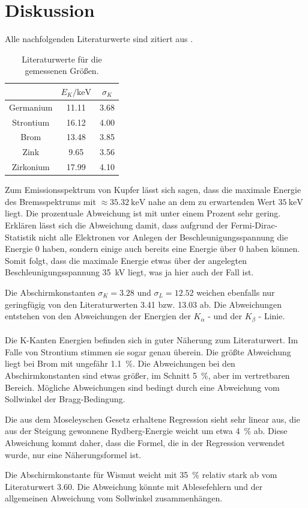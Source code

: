 \section{Diskussion}
Alle nachfolgenden Literaturwerte sind zitiert aus \cite{literatur}.
\begin{table}
  \centering
  \caption{Literaturwerte für die gemessenen Größen.}
  \label{tab:8}
  \begin{tabular}{c c c}
    \toprule
    & $E_K / \si{\kilo\electronvolt}$ & $\sigma_K$ \\
    \midrule
    Germanium & 11.11 & 3.68 \\
    Strontium & 16.12 & 4.00 \\
    Brom & 13.48 & 3.85 \\
    Zink & 9.65 & 3.56 \\
    Zirkonium & 17.99 & 4.10 \\
    \bottomrule
  \end{tabular}
\end{table}
Zum Emissionsspektrum von Kupfer lässt sich sagen, dass die maximale Energie des Bremsspektrums
mit $\approx \SI{35.32}{\kilo\electronvolt}$
nahe an dem zu erwartenden Wert $\SI{35}{\kilo\electronvolt}$ liegt. Die prozentuale Abweichung
ist mit unter einem Prozent sehr gering. Erklären lässt sich die Abweichung damit, dass
aufgrund der Fermi-Dirac-Statistik nicht alle Elektronen vor Anlegen der Beschleunigungsspannung
die Energie 0 haben, sondern einige auch bereits eine Energie über 0 haben können. Somit folgt,
dass die maximale Energie etwas über der angelegten Beschleunigungsspannung \SI{35}{\kilo\volt}
liegt, was ja hier auch der Fall ist.

Die Abschirmkonstanten $\sigma_K = \num{3.28}$ und $\sigma_L = \num{12.52}$ weichen ebenfalls
nur geringfügig von den Literaturwerten 3.41 bzw. 13.03 ab. Die Abweichungen entstehen von den Abweichungen
der Energien der $K_\alpha$ - und der $K_\beta$ - Linie. \\
\\
Die K-Kanten Energien befinden sich in guter Näherung zum Literaturwert. Im Falle von
Strontium stimmen sie sogar genau überein. Die größte Abweichung liegt bei Brom mit ungefähr
\SI{1.1}{\percent}. Die Abweichungen bei den Abschirmkonstanten sind etwas größer, im Schnitt
\SI{5}{\percent}, aber im vertretbaren Bereich. Mögliche Abweichungen sind bedingt durch eine Abweichung
vom Sollwinkel der Bragg-Bedingung.

Die aus dem Moseleyschen Gesetz erhaltene Regression sieht sehr linear aus, die aus der
Steigung gewonnene Rydberg-Energie weicht um etwa \SI{4}{\percent} ab. Diese Abweichung kommt daher,
dass die Formel, die in der Regression verwendet wurde, nur eine Näherungsformel ist.

Die Abschirmkonstante für Wismut weicht mit \SI{35}{\percent} relativ stark ab vom Literaturwert
\num{3.60}. Die Abweichung könnte mit Ablesefehlern und der allgemeinen Abweichung vom Sollwinkel
zusammenhängen.
\newpage
\nocite{*}
\printbibliography
